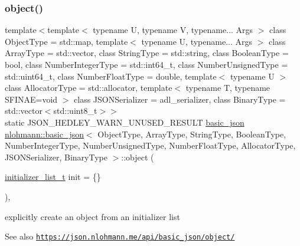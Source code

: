 \subsubsection{\texorpdfstring{object()}{object()}}
{\footnotesize\ttfamily template$<$template$<$ typename U, typename V, typename... Args $>$ class Object\+Type = std\+::map, template$<$ typename U, typename... Args $>$ class Array\+Type = std\+::vector, class String\+Type  = std\+::string, class Boolean\+Type  = bool, class Number\+Integer\+Type  = std\+::int64\+\_\+t, class Number\+Unsigned\+Type  = std\+::uint64\+\_\+t, class Number\+Float\+Type  = double, template$<$ typename U $>$ class Allocator\+Type = std\+::allocator, template$<$ typename T, typename S\+F\+I\+N\+A\+E=void $>$ class J\+S\+O\+N\+Serializer = adl\+\_\+serializer, class Binary\+Type  = std\+::vector$<$std\+::uint8\+\_\+t$>$$>$ \\
static J\+S\+O\+N\+\_\+\+H\+E\+D\+L\+E\+Y\+\_\+\+W\+A\+R\+N\+\_\+\+U\+N\+U\+S\+E\+D\+\_\+\+R\+E\+S\+U\+LT \hyperlink{classnlohmann_1_1basic__json}{basic\+\_\+json} \hyperlink{classnlohmann_1_1basic__json}{nlohmann\+::basic\+\_\+json}$<$ Object\+Type, Array\+Type, String\+Type, Boolean\+Type, Number\+Integer\+Type, Number\+Unsigned\+Type, Number\+Float\+Type, Allocator\+Type, J\+S\+O\+N\+Serializer, Binary\+Type $>$\+::object (\begin{DoxyParamCaption}\item[{\hyperlink{classnlohmann_1_1basic__json_ac569f292a070dfd2f6b69c16e746095a}{initializer\+\_\+list\+\_\+t}}]{init = {\ttfamily \{\}} }\end{DoxyParamCaption})\hspace{0.3cm}{\ttfamily [inline]}, {\ttfamily [static]}}



explicitly create an object from an initializer list 

\begin{DoxySeeAlso}{See also}
\href{https://json.nlohmann.me/api/basic_json/object/}{\tt https\+://json.\+nlohmann.\+me/api/basic\+\_\+json/object/} 
\end{DoxySeeAlso}
\mbox{\label{classnlohmann_1_1basic__json_a6d4b8df10ecc533a50823e8805f4a873}} 
